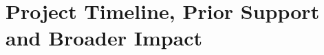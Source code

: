 \documentclass[12pt]{article}
\begin{document}
%
%
\pagestyle{empty} 
%
%
\setlength{\baselineskip}{12.6pt} %
\setlength{\normalbaselineskip}{12.6pt} %

%
%






\section{Project Timeline, Prior Support and Broader Impact}

\newpage
{}
\renewcommand{\thepage} {D--\arabic{page}}


\end{document}
